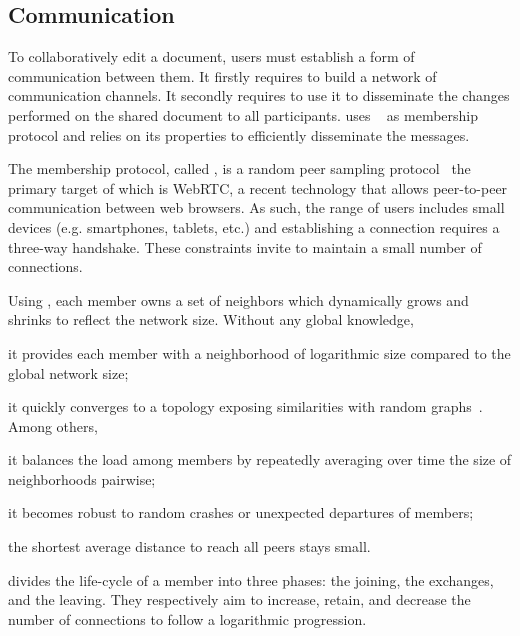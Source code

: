 \subsection{Communication}
\label{subsec:communication}

To collaboratively edit a document, users must establish a form of communication
between them. It firstly requires to build a network of communication
channels. It secondly requires to use it to disseminate the changes performed on
the shared document to all participants.  \CRATE uses
\SPRAY~\cite{nedelec2015spray} as membership protocol and relies on its
properties to efficiently disseminate the messages.

\begin{asparadesc}
\item [The membership protocol,] called \SPRAY, is a random peer sampling
  protocol~\cite{jelasity2007gossip} the primary target of which is WebRTC, a
  recent technology that allows peer-to-peer communication between web browsers.
  As such, the range of users includes small devices (e.g. smartphones, tablets,
  etc.) and establishing a connection requires a three-way handshake. These
  constraints invite to maintain a small number of connections.

  Using \SPRAY, each member owns a set of neighbors which dynamically grows and
  shrinks to reflect the network size. Without any global knowledge,
  \begin{inparaenum}[(i)]
  \item it provides each member with a neighborhood of logarithmic size compared
    to the global network size;
  \item it quickly converges to a topology exposing similarities with random
    graphs~\cite{erdos1959random}. Among others,
    \begin{inparaenum}[(a)]
    \item it balances the load among members by repeatedly averaging over time the
      size of neighborhoods pairwise;
    \item it becomes robust to random crashes or unexpected departures of
      members;
    \item the shortest average distance to reach all peers stays small.
    \end{inparaenum}
  \end{inparaenum}
  
  \SPRAY divides the life-cycle of a member into three phases: the joining, the
  exchanges, and the leaving. They respectively aim to increase, retain, and
  decrease the number of connections to follow a logarithmic progression.


\end{asparadesc}
